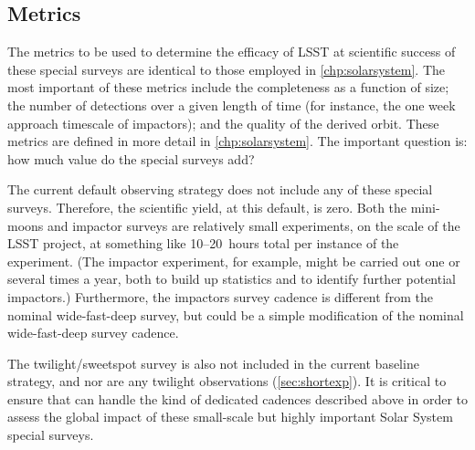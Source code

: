 
\subsection{Metrics}
\label{sec:\secname:metrics}

The metrics to be used to determine the efficacy of LSST
at scientific success of these special surveys are identical
to those employed in \autoref{chp:solarsystem}.
The most important of these metrics
include the completeness as a function of size; the
number of detections over a given length of time (for instance,
the one week approach timescale of impactors); and
the quality of the derived orbit. These metrics are defined
in more detail in \autoref{chp:solarsystem}. The important question is:
how much value do the special surveys add?

%
%

The current default observing strategy does not include
any of these special surveys. Therefore, the scientific yield,
at this default, is zero. Both the mini-moons and impactor
surveys are relatively small experiments, on the scale of
the LSST project, at something like 10--20~hours total
per instance of the experiment. (The impactor experiment,
for example, might be carried out one or several times a year,
both to build up statistics and to identify further potential
impactors.) Furthermore, the impactors survey cadence
is different from the nominal wide-fast-deep survey,
but could be a simple modification of the nominal wide-fast-deep survey
cadence.

The twilight/sweetspot survey is also not included in
the current baseline \OpSim strategy, and nor are any twilight observations (\autoref{sec:shortexp}).
It is critical to ensure that \OpSim can handle the kind
of dedicated cadences described above in order to assess
the global impact of these small-scale but highly
important Solar System special surveys.



%
%
%
%

